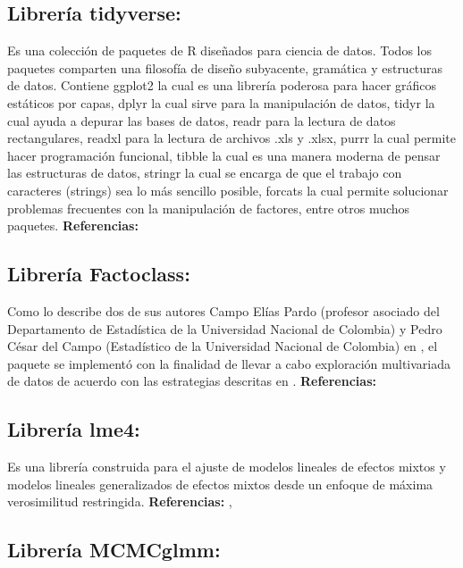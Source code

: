 \documentclass[]{book}
\theoremstyle{definition}
\theoremstyle{definition}
\theoremstyle{definition}
\theoremstyle{remark}
\begin{document}
\subsection{Librería tidyverse:}\label{libreria-tidyverse}

Es una colección de paquetes de R diseñados para ciencia de datos. Todos
los paquetes comparten una filosofía de diseño subyacente, gramática y
estructuras de datos. Contiene ggplot2 la cual es una librería poderosa
para hacer gráficos estáticos por capas, dplyr la cual sirve para la
manipulación de datos, tidyr la cual ayuda a depurar las bases de datos,
readr para la lectura de datos rectangulares, readxl para la lectura de
archivos .xls y .xlsx, purrr la cual permite hacer programación
funcional, tibble la cual es una manera moderna de pensar las
estructuras de datos, stringr la cual se encarga de que el trabajo con
caracteres (strings) sea lo más sencillo posible, forcats la cual
permite solucionar problemas frecuentes con la manipulación de factores,
entre otros muchos paquetes. \textbf{Referencias:} \citep{tidyverse}

\subsection{Librería Factoclass:}\label{libreria-factoclass}

Como lo describe dos de sus autores Campo Elías Pardo (profesor asociado
del Departamento de Estadística de la Universidad Nacional de Colombia)
y Pedro César del Campo (Estadístico de la Universidad Nacional de
Colombia) en \citep{Pardo2007}, el paquete se implementó con la
finalidad de llevar a cabo exploración multivariada de datos de acuerdo
con las estrategias descritas en \citep{Lebart} . \textbf{Referencias:}
\citep{Factoclass}

\subsection{Librería lme4:}\label{libreria-lme4}

Es una librería construida para el ajuste de modelos lineales de efectos
mixtos y modelos lineales generalizados de efectos mixtos desde un
enfoque de máxima verosimilitud restringida. \textbf{Referencias:}
\citep{lme4}, \citep{Bates}

\subsection{Librería MCMCglmm:}\label{libreria-mcmcglmm}
\end{document}
